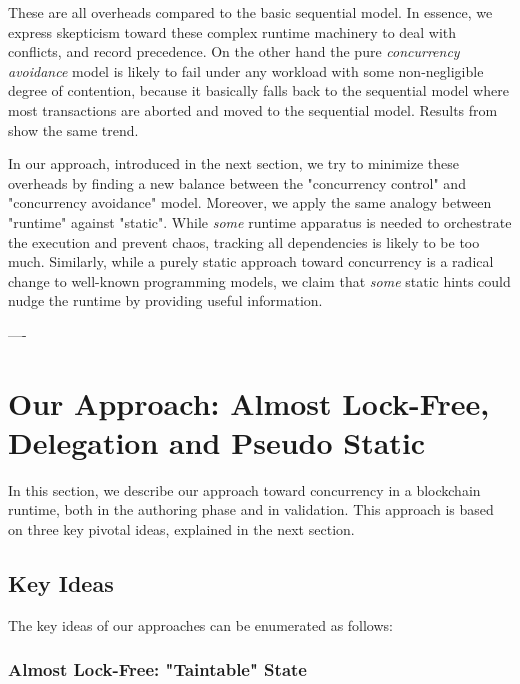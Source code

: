 These are all overheads compared to the basic sequential model. In essence, we express skepticism
toward these complex runtime machinery to deal with conflicts, and record precedence. On the other
hand the pure \textit{concurrency avoidance} model is likely to fail under any workload with some
non-negligible degree of contention, because it basically falls back to the sequential model where
most transactions are aborted and moved to the sequential model. Results from
\cite{saraphYOLOEmpiricalStudy2019} show the same trend.

In our approach, introduced in the next section, we try to minimize these overheads by finding a new
balance between the "concurrency control" and "concurrency avoidance" model. Moreover, we apply the
same analogy between "runtime" against "static". While \textit{some} runtime apparatus is needed to
orchestrate the execution and prevent chaos, tracking all dependencies is likely to be too much.
Similarly, while a purely static approach toward concurrency is a radical change to well-known
programming models, we claim that \textit{some} static hints could nudge the runtime by providing
useful information.

----

\section{Our Approach: Almost Lock-Free, Delegation and Pseudo Static}
\label{chap_desgin:sec:design}

In this section, we describe our approach toward concurrency in a blockchain runtime, both in
the authoring phase and in validation. This approach is based on three key pivotal ideas, explained
in the next section.

\subsection{Key Ideas}

The key ideas of our approaches can be enumerated as follows:

\subsubsection{Almost Lock-Free: "Taintable" State}\label{chapt_approach:subsubsec:taintable_state}

